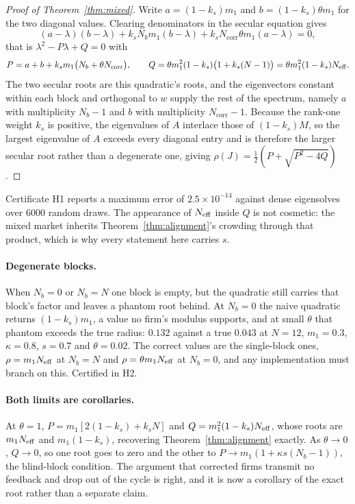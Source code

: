 \begin{proof}[Proof of Theorem~\ref{thm:mixed}]
Write $a = (1-k_s)m_1$ and $b = (1-k_s)\theta m_1$ for the two diagonal values. Clearing denominators in the secular equation gives
\[
  (a-\lambda)(b-\lambda) + k_s N_b m_1 (b-\lambda) + k_s N_{\text{corr}}\theta m_1 (a-\lambda) = 0,
\]
that is $\lambda^2 - P\lambda + Q = 0$ with
\[
  P = a + b + k_s m_1\big(N_b + \theta N_{\text{corr}}\big),
  \qquad
  Q = \theta m_1^2 (1-k_s)\big(1 + k_s(N-1)\big) = \theta m_1^2 (1-k_s)N_{\mathrm{eff}} .
\]
The two secular roots are this quadratic's roots, and the eigenvectors constant within each block and orthogonal to $w$ supply the rest of the spectrum, namely $a$ with multiplicity $N_b-1$ and $b$ with multiplicity $N_{\text{corr}}-1$. Because the rank-one weight $k_s$ is positive, the eigenvalues of $A$ interlace those of $(1-k_s)M$, so the largest eigenvalue of $A$ exceeds every diagonal entry and is therefore the larger secular root rather than a degenerate one, giving $\rho(J) = \tfrac{1}{2}(P + \sqrt{P^2-4Q})$.
\end{proof}

Certificate H1 reports a maximum error of $2.5\times 10^{-14}$ against dense eigensolves over 6000 random draws. The appearance of $N_{\mathrm{eff}}$ inside $Q$ is not cosmetic: the mixed market inherits Theorem~\ref{thm:alignment}'s crowding through that product, which is why every statement here carries $s$.

\paragraph{Degenerate blocks.} When $N_b = 0$ or $N_b = N$ one block is empty, but the quadratic still carries that block's factor and leaves a phantom root behind. At $N_b = 0$ the naive quadratic returns $(1-k_s)m_1$, a value no firm's modulus supports, and at small $\theta$ that phantom exceeds the true radius: $0.132$ against a true $0.043$ at $N=12$, $m_1=0.3$, $\kappa=0.8$, $s=0.7$ and $\theta=0.02$. The correct values are the single-block ones, $\rho = m_1N_{\mathrm{eff}}$ at $N_b=N$ and $\rho = \theta m_1 N_{\mathrm{eff}}$ at $N_b=0$, and any implementation must branch on this. Certified in H2.

\paragraph{Both limits are corollaries.} At $\theta = 1$, $P = m_1[2(1-k_s)+k_sN]$ and $Q = m_1^2(1-k_s)N_{\mathrm{eff}}$, whose roots are $m_1N_{\mathrm{eff}}$ and $m_1(1-k_s)$, recovering Theorem~\ref{thm:alignment} exactly. As $\theta \to 0$, $Q \to 0$, so one root goes to zero and the other to $P \to m_1(1+\kappa s(N_b-1))$, the blind-block condition. The argument that corrected firms transmit no feedback and drop out of the cycle is right, and it is now a corollary of the exact root rather than a separate claim.

